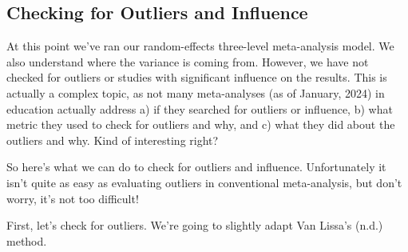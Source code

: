 \documentclass[
]{book}
\begin{document}
\hypertarget{checking-for-outliers-and-influence-1}{%
\subsection{Checking for Outliers and Influence}\label{checking-for-outliers-and-influence-1}}

At this point we've ran our random-effects three-level meta-analysis model. We also understand where the variance is coming from. However, we have not checked for outliers or studies with significant influence on the results. This is actually a complex topic, as not many meta-analyses (as of January, 2024) in education actually address a) if they searched for outliers or influence, b) what metric they used to check for outliers and why, and c) what they did about the outliers and why. Kind of interesting right?

So here's what we can do to check for outliers and influence. Unfortunately it isn't quite as easy as evaluating outliers in conventional meta-analysis, but don't worry, it's not too difficult!

First, let's check for outliers. We're going to slightly adapt Van Lissa's (n.d.)\citep{vanlissa} method.
\end{document}
